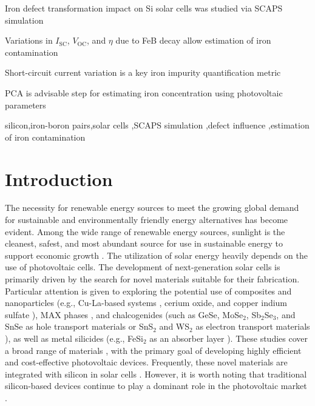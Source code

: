 \documentclass[a4paper,fleqn]{cas-sc}
\begin{document}

\begin{highlights}
\item Iron defect transformation impact on Si solar cells was studied via SCAPS simulation
\item Variations in $I_\mathrm{SC}$, $V_\mathrm{OC}$, and $\eta$ due to FeB decay allow estimation of iron contamination
\item Short-circuit current variation is a key iron impurity quantification metric
\item PCA is advisable step for estimating iron concentration using photovoltaic parameters
\end{highlights}


\begin{keywords}
 silicon\sep iron-boron pairs\sep solar cells \sep SCAPS simulation \sep defect influence \sep estimation of iron contamination
\end{keywords}

\maketitle

\section{Introduction}%
\par
The necessity for renewable energy sources to meet the growing global demand for sustainable and environmentally friendly energy alternatives has become evident.
Among the wide range of renewable energy sources, sunlight is the cleanest, safest,
and most abundant source for use in sustainable energy to support economic growth \cite{PratapSingh2019}.
The utilization of solar energy heavily depends on the use of photovoltaic cells.
The development of next-generation solar cells is primarily driven by the search for novel materials suitable for their fabrication.
Particular attention is given to exploring the potential use of composites and nanoparticles
(e.g., Cu-La-based systems \cite{Paul2024}, cerium oxide, and copper indium sulfate \cite{Gayathri2024}),
MAX phases \cite{Behera2024,AzzouzRached2024},
and chalcogenides (such as GeSe, MoSe$_2$, Sb$_2$Se$_3$, and SnSe as hole transport materials \cite{MasumMia2025}
or SnS$_2$ and WS$_2$ as electron transport materials \cite{Rahman2024}),
as well as metal silicides (e.g., FeSi$_2$ as an absorber layer \cite{Sultana2024}).
These studies cover a broad range of materials \cite{AlanSibu2024}, with the primary goal of developing highly efficient and cost-effective photovoltaic devices.
Frequently, these novel materials are integrated with silicon in solar cells \cite{Sultana2024, Akila2024}.
However, it is worth noting that traditional silicon-based devices
continue to play a dominant role in the photovoltaic market \cite{Basnet2024,Wang2024}.
\end{document}
